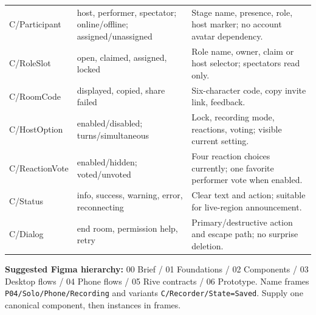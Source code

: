 \documentclass[10pt,a4paper]{article}
\begin{document}
\begin{longtable}{@{}>{\raggedright\arraybackslash}p{29mm}>{\raggedright\arraybackslash}p{58mm}>{\raggedright\arraybackslash}p{71mm}@{}}
C/Participant & host, performer, spectator; online/offline; assigned/unassigned & Stage name, presence, role, host marker; no account avatar dependency.\\
C/RoleSlot & open, claimed, assigned, locked & Role name, owner, claim or host selector; spectators read only.\\
C/RoomCode & displayed, copied, share failed & Six-character code, copy invite link, feedback.\\
C/HostOption & enabled/disabled; turns/simultaneous & Lock, recording mode, reactions, voting; visible current setting.\\
C/ReactionVote & enabled/hidden; voted/unvoted & Four reaction choices currently; one favorite performer vote when enabled.\\
C/Status & info, success, warning, error, reconnecting & Clear text and action; suitable for live-region announcement.\\
C/Dialog & end room, permission help, retry & Primary/destructive action and escape path; no surprise deletion.\\
\bottomrule
\end{longtable}
\renewcommand{\arraystretch}{1}
\normalsize
\begin{callout}
\textbf{Suggested Figma hierarchy:} 00 Brief / 01 Foundations / 02 Components / 03 Desktop flows / 04 Phone flows / 05 Rive contracts / 06 Prototype. Name frames \texttt{P04/Solo/Phone/Recording} and variants \texttt{C/Recorder/State=Saved}. Supply one canonical component, then instances in frames.
\end{callout}
\end{document}
